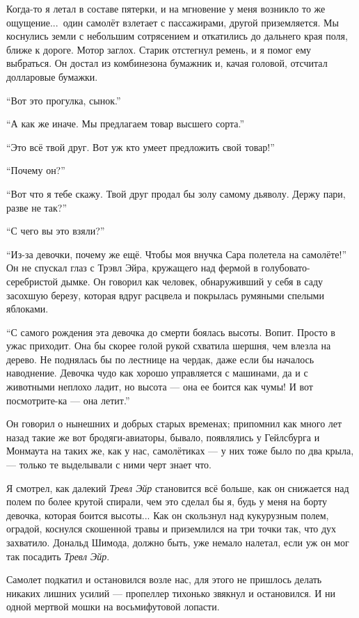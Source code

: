 Когда-то я летал в составе пятерки, и на мгновение у меня возникло то же ощущение...\ один самолёт взлетает с пассажирами, другой приземляется. Мы коснулись земли с небольшим сотрясением и откатились до дальнего края поля, ближе к дороге. Мотор заглох. Старик отстегнул ремень, и я помог ему выбраться. Он достал из комбинезона бумажник и, качая головой, отсчитал долларовые бумажки.

``Вот это прогулка, сынок.''

``А как же иначе. Мы предлагаем товар высшего сорта.''

``Это всё твой друг. Вот уж кто умеет предложить свой товар!''

``Почему он?''

``Вот что я тебе скажу. Твой друг продал бы золу самому дьяволу. Держу пари, разве не так?''

``С чего вы это взяли?''

``Из-за девочки, почему же ещё. Чтобы моя внучка Сара полетела на самолёте!'' Он не спускал
 глаз с Трэвл Эйра, кружащего над фермой в го\-лу\-бо\-ва\-то-се\-реб\-рис\-той дымке. Он говорил как человек, обнаруживший у себя в саду засохшую березу, которая вдруг расцвела и покрылась румяными спелыми яблоками.

``С самого рождения эта девочка до смерти боялась высоты. Вопит. Просто в ужас приходит. Она бы
 скорее голой рукой схватила шершня, чем влезла на дерево. Не поднялась бы по лестнице на чердак,
 даже если бы началось наводнение. Девочка чудо как хорошо управляется с машинами, да и с
 животными неплохо ладит, но высота --- она ее боится как чумы! И вот посмотрите-ка --- она летит.''

Он говорил о нынешних и добрых старых временах; припомнил как много лет назад такие же вот бродяги-авиаторы, бывало, появлялись у Гейлсбурга и Монмаута на таких же, как у нас, самолётиках --- у них тоже было по два крыла, --- только те выделывали с ними черт знает что.

Я смотрел, как далекий {\it Тревл Эйр\/} становится всё больше, как он снижается над полем по
более крутой спирали, чем это сделал бы я, будь у меня на борту девочка, которая боится высоты...
Как он скользнул над кукурузным полем, оградой, коснулся скошенной травы и приземлился на три
точки так, что дух захватило. Дональд Шимода, должно быть, уже немало налетал, если уж он мог так
посадить {\it Тревл Эйр}.

Самолет подкатил и остановился возле нас, для этого не пришлось делать никаких лишних усилий --- пропеллер тихонько звякнул и остановился. И ни одной мертвой мошки на восьмифутовой лопасти.


